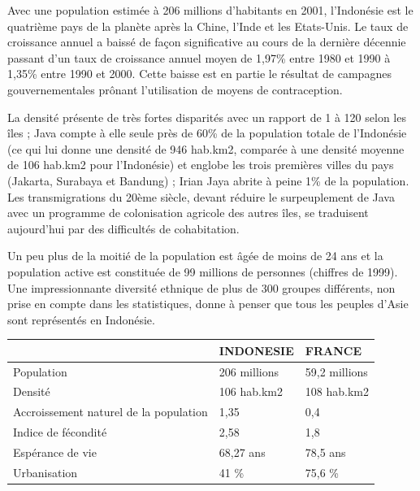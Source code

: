 Avec une population estimée à 206 millions d'habitants en 2001, l'Indonésie est le quatrième pays de la planète après la Chine, l'Inde et les Etats-Unis. Le taux de croissance annuel a baissé de façon significative au cours de la dernière décennie passant d'un taux de croissance annuel moyen de 1,97\% entre 1980 et 1990 à 1,35\% entre 1990 et 2000. Cette baisse est en partie le résultat de campagnes gouvernementales prônant l'utilisation de moyens de contraception.

La densité présente de très fortes disparités avec un rapport de 1 à 120 selon les îles ; Java compte à elle seule près de 60\% de la population totale de l'Indonésie (ce qui lui donne une densité de 946 hab.km2, comparée à une densité moyenne de 106 hab.km2 pour l'Indonésie) et englobe les trois premières villes du pays (Jakarta, Surabaya et Bandung) ; Irian Jaya abrite à peine 1\% de la population. Les transmigrations du 20ème siècle, devant réduire le surpeuplement de Java avec un programme de colonisation agricole des autres îles, se traduisent aujourd'hui par des difficultés de cohabitation.

Un peu plus de la moitié de la population est âgée de moins de 24 ans et la population active est constituée de 99 millions de personnes (chiffres de 1999). Une impressionnante diversité ethnique de plus de 300 groupes différents, non prise en compte dans les statistiques, donne à penser que tous les peuples d'Asie sont représentés en Indonésie.


\hspace*{-0.65cm}
\begin{tabularx}{8cm}{|l|l|l|}
    \hline
    & INDONESIE & FRANCE \\
    \hline
    Population & 206 millions & 59,2 millions \\
    \hline
    Densité & 106 hab.km2 & 108 hab.km2 \\
    \hline
    Accroissement naturel de la population & 1,35 & 0,4 \\
    \hline
    Indice de fécondité & 2,58 & 1,8 \\
    \hline
    Espérance de vie & 68,27 ans & 78,5 ans \\
    \hline
    Urbanisation & 41 \% & 75,6 \% \\
    \hline
\end{tabularx}


